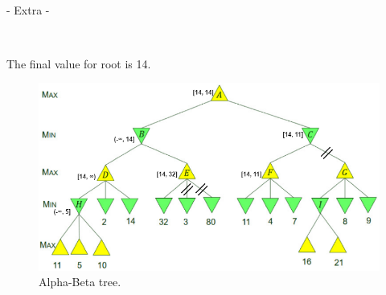 \documentclass[12pt]{article}
\begin{document}
\noindent \hrulefill \\\pagebreak



\centerline{- Extra - }
\ \\
\centerline{The final value for root is 14.}
\begin{figure}[htbp]
\centerline{\includegraphics[scale=.75]{Pics/ComS472_Extra.png}}
\caption{Alpha-Beta tree.}
\label{Alpha-Beta tree.}
\end{figure}
\end{document}
